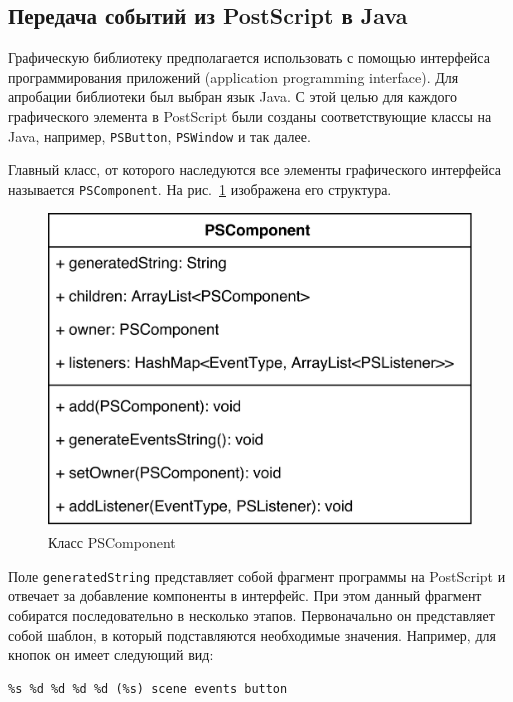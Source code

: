 \subsection{Передача событий из PostScript в Java}

Графическую библиотеку предполагается использовать с помощью интерфейса программирования приложений (application programming interface). Для апробации библиотеки был выбран язык Java. С этой целью для каждого графического элемента в PostScript были созданы соответствующие классы на Java, например, \texttt{PSButton}, \texttt{PSWindow} и так далее.

Главный класс, от которого наследуются все элементы графического интерфейса называется \texttt{PSComponent}. На рис.~\ref{pscomponent} изображена его структура.

\begin{figure}[h]
\centering
\includegraphics[width=\textwidth]{Makulov/PSComponent_structure.png}
\caption{Класс PSComponent}
\label{pscomponent}
\end{figure}


Поле \texttt{generatedString} представляет собой фрагмент программы на PostScript и отвечает за добавление компоненты в интерфейс. При этом данный фрагмент собиратся последовательно в несколько этапов. Первоначально он представляет собой шаблон, в который подставляются необходимые значения. Например, для кнопок он имеет следующий вид:

\lstset{language=Java,basicstyle=\footnotesize\ttfamily} 
\begin{lstlisting}
%s %d %d %d %d (%s) scene events button
\end{lstlisting}

